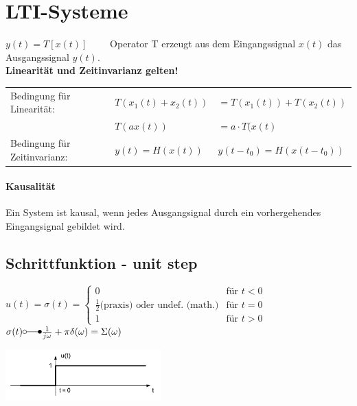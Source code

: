 \section{LTI-Systeme }
\begin{center}
	
\end{center}

$ y(t) = T [ x(t)] \qquad $ Operator T erzeugt aus dem Eingangssignal $ x(t) $ das Ausgangssignal $ y(t)$. \\
\textbf{Linearität und Zeitinvarianz gelten!}\\
\begin{tabular}{lll}
	Bedingung für Linearität: & $T(x_1(t)+x_2(t))$ & $= T(x_1(t)) + T(x_2(t))$ \\
	& $T(ax(t))$ & $= a\cdot T(x(t)$\\
	Bedingung für Zeitinvarianz: & $y(t) = H(x(t))$ & $y(t-t_0) = H(x(t-t_0))$ \\
\end{tabular}

	\paragraph{Kausalität} Ein System ist kausal, wenn jedes Ausgangsignal durch ein vorhergehendes Eingangsignal gebildet wird.
\\

\subsection{Schrittfunktion - unit step}
	\begin{minipage}{10cm}
		$u(t) = \sigma(t) =	\begin{cases}
		  		 0 & \text{für } t < 0 \\
		  		 \frac{1}{2} \text{(praxis)}  \text{ oder undef. (math.)} & \text{für } t = 0 \\
		  		 1 & \text{für } t > 0
		  	\end{cases}
		$
		$\sigma(t) \laplace \frac{1}{j\omega} + \pi\delta(\omega) = \Sigma(\omega)$
	\end{minipage}
	\begin{minipage}{8cm}
		\includegraphics[width=6cm]{./bilder/unitstep.png}
	\end{minipage}

